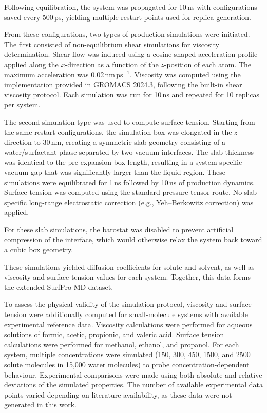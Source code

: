 \documentclass[letterpaper]{article}
\begin{document}
Following equilibration, the system was propagated for 10\,ns with configurations saved every 500\,ps, yielding multiple restart points used for replica generation.

From these configurations, two types of production simulations were initiated. The first consisted of non-equilibrium shear simulations for viscosity determination. Shear flow was induced using a cosine-shaped acceleration profile applied along the $x$-direction as a function of the $z$-position of each atom. The maximum acceleration was 0.02\,nm\,ps$^{-1}$. Viscosity was computed using the implementation provided in GROMACS 2024.3, following the built-in shear viscosity protocol. Each simulation was run for 10\,ns and repeated for 10 replicas per system.

The second simulation type was used to compute surface tension. Starting from the same restart configurations, the simulation box was elongated in the $z$-direction to 30\,nm, creating a symmetric slab geometry consisting of a water/surfactant phase separated by two vacuum interfaces. The slab thickness was identical to the pre-expansion box length, resulting in a system-specific vacuum gap that was significantly larger than the liquid region. These simulations were equilibrated for 1\,ns followed by 10\,ns of production dynamics. Surface tension was computed using the standard pressure-tensor route. No slab-specific long-range electrostatic correction (e.g., Yeh--Berkowitz correction) was applied.

For these slab simulations, the barostat was disabled to prevent artificial compression of the interface, which would otherwise relax the system back toward a cubic box geometry.

These simulations yielded diffusion coefficients for solute and solvent, as well as viscosity and surface tension values for each system. Together, this data forms the extended SurfPro-MD dataset.

To assess the physical validity of the simulation protocol, viscosity and surface tension were additionally computed for small-molecule systems with available experimental reference data. Viscosity calculations were performed for aqueous solutions of formic, acetic, propionic, and valeric acid. Surface tension calculations were performed for methanol, ethanol, and propanol. For each system, multiple concentrations were simulated (150, 300, 450, 1500, and 2500 solute molecules in 15,000 water molecules) to probe concentration-dependent behaviour. Experimental comparisons were made using both absolute and relative deviations of the simulated properties. The number of available experimental data points varied depending on literature availability, as these data were not generated in this work.
\end{document}
